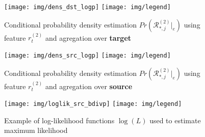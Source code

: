 \begin{figure}[h!]%
  \centering
  \texttt{[image: img/dens\_dst\_logp]}
      \texttt{[image: img/legend]}
  \caption{Conditional probability density estimation $Pr ( \mathcal{R}^{(2)}_{*,j}|_e ) $ using feature $r_t^{(2)}$ and agregation over \textbf{target}}
  \label{fig:dens_dst_logp}
\end{figure}
\begin{figure}[h!]%
  \centering
  \texttt{[image: img/dens\_src\_logp]}
  \texttt{[image: img/legend]}
  \caption{Conditional probability density estimation $Pr ( \mathcal{R}^{(2)}_{*,j}|_e ) $ using feature $r_t^{(2)}$ and agregation over \textbf{source}}
  \label{fig:dens_src_logp}
\end{figure}
\begin{figure}[h!]%
  \centering
  \texttt{[image: img/loglik\_src\_bdivp]}
  \texttt{[image: img/legend]}
  \caption{Example of log-likelihood functions $\log(L)$ used to estimate maximum likelihood}
  \label{fig:loglik_src_bdivp}
\end{figure}


